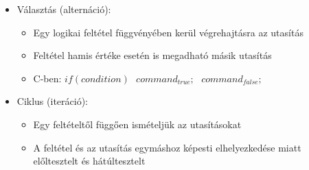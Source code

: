 \documentclass[11pt,a4paper]{article}
\begin{document}
\begin{tcolorbox}[colback=blue!5!white,colframe=blue!50!black,title= 16. Ismertesse az alapvető algoritmus-elemeket a Böhm-Jacopini tétel alapján!]
\begin{itemize}
\begin{itemize}
\begin{center}
                        \end{center}
                    \end{itemize}
                    \item Választás (alternáció):
                    \begin{itemize}
                        \item Egy logikai feltétel függvényében kerül végrehajtásra az utasítás
                        \item Feltétel hamis értéke esetén is megadható másik utasítás 
                        \item C-ben: \(if (condition)\hspace{8pt} command_{true} ;\hspace{8pt} command_{false};\)
                        \begin{center}
                        \end{center}
                    \end{itemize}
                    \item Ciklus (iteráció):
                    \begin{itemize}
                        \item Egy feltételtől függően ismételjük az utasításokat
                        \item A feltétel és az utasítás egymáshoz képesti elhelyezkedése miatt előltesztelt és hátúltesztelt
                    \end{itemize}
                    \begin{center}

\end{center}
\end{itemize}
\end{tcolorbox}
\end{document}
